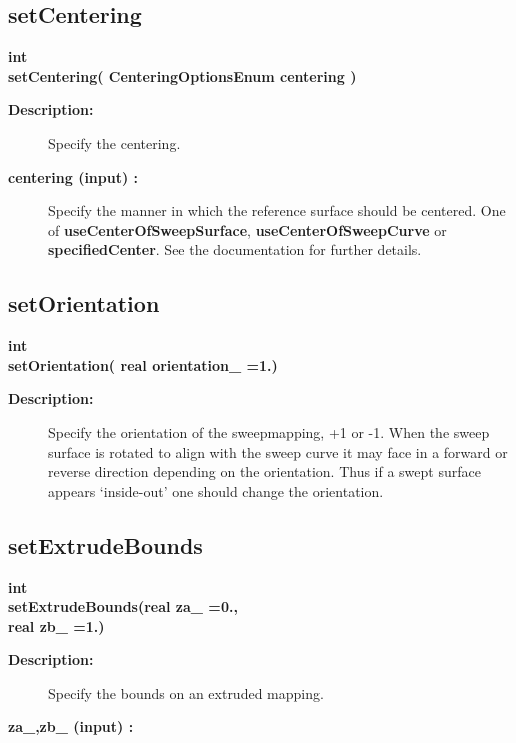 \subsection{setCentering}
 
\begin{flushleft} \textbf{%
int  \\ 
\settowidth{\SweepMappingIncludeArgIndent}{setCentering(}%
setCentering( CenteringOptionsEnum centering )
}\end{flushleft}
\begin{description}
\item[{\bf Description:}]  Specify the centering.
\item[{\bf centering (input) :}]  Specify the manner in which the reference surface should be centered.
   One of {\bf useCenterOfSweepSurface}, {\bf useCenterOfSweepCurve} or {\bf specifiedCenter}.
   See the documentation for further details.
\end{description}
\subsection{setOrientation}
 
\begin{flushleft} \textbf{%
int  \\ 
\settowidth{\SweepMappingIncludeArgIndent}{setOrientation(}%
setOrientation( real orientation\_  =1.)
}\end{flushleft}
\begin{description}
\item[{\bf Description:}]  Specify the orientation of the sweepmapping, +1 or -1.
   When the sweep surface is rotated to align with the sweep curve it may
 face in a forward or reverse direction depending on the orientation. Thus if a
 swept surface appears `inside-out' one should change the orientation.
\end{description}
\subsection{setExtrudeBounds}
 
\begin{flushleft} \textbf{%
int  \\ 
\settowidth{\SweepMappingIncludeArgIndent}{setExtrudeBounds(}%
setExtrudeBounds(real za\_  =0., \\ 
\hspace{\SweepMappingIncludeArgIndent}real zb\_  =1.)
}\end{flushleft}
\begin{description}
\item[{\bf Description:}]  Specify the bounds on an extruded mapping.
\item[{\bf za\_,zb\_ (input) :}]  
\end{description}
